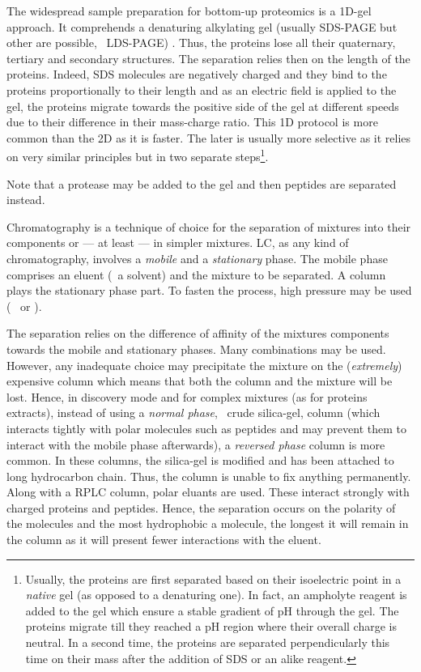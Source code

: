 The widespread sample preparation for bottom-up proteomics is a 1D-gel approach.
It comprehends a denaturing alkylating gel (usually \gls{SDS-PAGE} but other are
possible, \eg\ \gls{LDS-PAGE}) . Thus, the proteins lose
all their quaternary, tertiary and secondary structures. The separation relies
then on the length of the proteins. Indeed, \gls{SDS} molecules are negatively
charged and they bind to the proteins proportionally to their length and as an
electric field is applied to the gel, the proteins migrate towards the positive
side of the gel at different speeds due to their difference in their mass-charge
ratio. This 1D protocol is more common than the 2D as it is faster. The later is
usually more selective as it relies on very similar principles but in two separate
steps\footnote{Usually, the proteins are first separated based on their
isoelectric point in a \emph{native} gel (as opposed to a denaturing one).
In fact, an \gls{ampholyte} reagent is added to the gel which ensure a stable
gradient of \gls{pH} through the gel. The proteins migrate till they reached a
\gls{pH} region where their overall charge is neutral. In a second time, the
proteins are separated perpendicularly this time on their mass after the addition
of \gls{SDS} or an alike reagent.}.

Note that a protease may be added to the gel and then peptides are separated
instead.


Chromatography is a technique of choice for the separation of mixtures into their
components or --- at least --- in simpler mixtures. \gls{LC}, as any kind of
chromatography, involves a \emph{mobile} and a \emph{stationary} phase.
The mobile phase comprises an eluent (\ie\ a solvent) and the mixture to be
separated. A column plays the stationary phase part. To fasten the process, high
pressure may be used (\eg\  or ).

The separation relies on the difference of affinity of the mixtures components
towards the mobile and stationary phases. Many combinations may be used. However,
any inadequate choice may precipitate the mixture on the (\emph{extremely})
expensive column which means that both the column and the mixture will be lost.
Hence, in discovery mode and for complex mixtures (as for proteins extracts),
instead of using a \emph{normal phase}, \ie\ crude silica-gel, column (which
interacts tightly with polar molecules such as peptides and may prevent them to
interact with the mobile phase afterwards), a \emph{reversed phase} column
is more common. In these columns, the silica-gel is modified and has been
attached to long hydrocarbon chain. Thus, the column is unable to fix anything
permanently. Along with a \gls{RPLC} column, polar eluants are used. These
interact strongly with charged proteins and peptides. Hence, the separation
occurs on the polarity of the molecules and the most hydrophobic a molecule,
the longest it will remain in the column as it will present fewer interactions
with the eluent.

